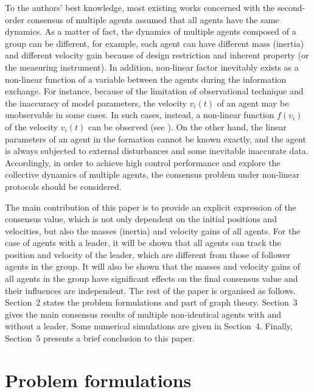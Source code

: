 \documentclass{cta-author}
\begin{document}
To the authors' best knowledge, most existing works concerned with
the second-order consensus of multiple agents assumed that all
agents have the same dynamics. As a matter of fact, the dynamics of multiple
agents composed of a group can be different, for example, each agent
can have different mass (inertia) and different velocity gain because of
design restriction and inherent property (or the measuring
instrument). In addition, non-linear factor inevitably exists as a
non-linear function of a variable between the agents during the
information exchange. For instance, because of the limitation of
observational technique and the inaccuracy of model parameters, the
velocity $v_{i}(t)$ of an agent may be unobservable in some cases.
In such cases, instead, a non-linear function $f(v_{i})$ of the
velocity $v_{i}(t)$ can be observed (see ). On the other hand, the linear parameters of an agent
in the formation cannot be known exactly, and the agent is always
subjected to external disturbances and some inevitable inaccurate
data. Accordingly, in order to achieve high control performance and
explore the collective dynamics of multiple agents, the consensus
problem under non-linear protocols should be considered.

The main contribution of this paper is to provide an explicit
expression of the consensus value, which is not only dependent on
the initial positions and velocities, but also the masses (inertia)
and velocity gains of all agents. For the case of agents with a leader,
it will be shown that all agents can track the position and velocity of the leader,
which are different from those of follower agents in the group. It
will also be shown that the masses and velocity gains of all agents in
the group have significant effects on the final consensus value and
their influences are independent. The rest of the paper is organised as
follows. Section~2 states the problem formulations and part of graph
theory. Section~3 gives the main consensus results of multiple
non-identical agents with and without a leader. Some numerical
simulations are given in Section~4. Finally, Section~5 presents a
brief conclusion to this paper.

\section{Problem formulations}\label{sec2}
\end{document}

